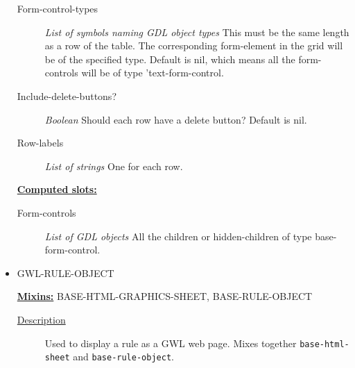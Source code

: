 \documentclass [11pt]{book}
\begin{document}
\begin{itemize}
\begin{description}
\item [Form-control-types]
\emph{List of symbols naming GDL object types} This must be
the same length as a row of the table. The corresponding
form-element in the grid will be of the specified type.
Default is nil, which means all the form-controls will
be of type 'text-form-control.


\item [Include-delete-buttons?]
\emph{Boolean} Should each row have a delete button?
Default is nil.


\item [Row-labels]
\emph{List of strings} One for each row.


\end{description}






\textbf{
\underline{Computed slots:}}

\begin{description}

\item [Form-controls]
\emph{List of GDL objects} All the children or hidden-children
of type base-form-control.


\end{description}







\item {}GWL-RULE-OBJECT


\textbf{
\underline{Mixins:}} BASE-HTML-GRAPHICS-SHEET, BASE-RULE-OBJECT





\begin{description}

\item [
\underline{Description}]


Used to display a rule as a GWL web page. 
Mixes together \texttt{base-html-sheet} and \texttt{base-rule-object}.



\end{description}










\end{itemize}
\end{document}
